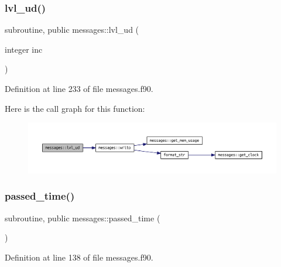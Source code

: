 \subsubsection{\texorpdfstring{lvl\+\_\+ud()}{lvl\_ud()}}
{\footnotesize\ttfamily subroutine, public messages\+::lvl\+\_\+ud (\begin{DoxyParamCaption}\item[{integer}]{inc }\end{DoxyParamCaption})}



Definition at line 233 of file messages.\+f90.

Here is the call graph for this function\+:
\nopagebreak
\begin{figure}[H]
\begin{center}
\leavevmode
\includegraphics[width=350pt]{namespacemessages_a6e6bfb084063e4cc91ee86e542043302_cgraph}
\end{center}
\end{figure}
\mbox{\label{namespacemessages_aced7e14a8b4fbed8eae60217b71ca546}} 
\subsubsection{\texorpdfstring{passed\+\_\+time()}{passed\_time()}}
{\footnotesize\ttfamily subroutine, public messages\+::passed\+\_\+time (\begin{DoxyParamCaption}{ }\end{DoxyParamCaption})}



Definition at line 138 of file messages.\+f90.


